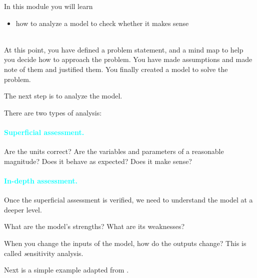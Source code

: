 In this module you will learn
\begin{itemize}
	\item how to analyze a model to check whether it makes sense
\end{itemize}

\hfill \\



At this point, you have defined a problem statement, and a mind map to help you decide how to approach the problem. You have made assumptions and made note of them and justified them.
You finally created a model to solve the problem.

The next step is to analyze the model.

There are two types of analysis:


\paragraph{\textcolor{cyan}{\textbf{Superficial assessment.}}} Are the units correct? Are the variables and parameters of a reasonable magnitude? Does it behave as expected? Does it make sense?



\paragraph{\textcolor{cyan}{\textbf{In-depth assessment.}}} Once the superficial assessment is verified, we need to understand the model at a deeper level. 

What are the model's strengths? What are its weaknesses?

When you change the inputs of the model, how do the outputs change? This is called {\emph sensitivity analysis}. 


Next is a simple example adapted from \cite{bliss}.


\begin{annotation}
	\begin{goals}
	\hfill {}	
	\end{goals}
\end{annotation}

